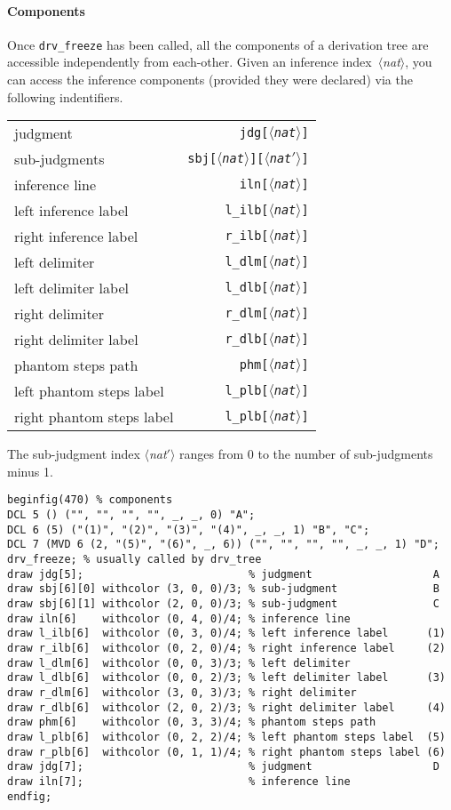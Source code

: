 \documentclass[twoside,11pt]{article}
\newcommand{\param}[1]{\textrm{\textit{$\langle$#1\/$\rangle$}}}
\begin{document}
\paragraph{Components}
%
%
Once \texttt{drv\_freeze} has been called, all the components of a derivation
tree are accessible independently from each-other. Given an inference
index~\param{nat}, you can access the inference components (provided they were
declared) via the following indentifiers.
\begin{center}
\begin{tabular}{lr}
judgment			&\texttt{jdg[\param{nat}]}\\
sub-judgments			&\texttt{sbj[\param{nat}][\param{nat$'$}]}\\
inference line			&\texttt{iln[\param{nat}]}\\
left inference label		&\texttt{l\_ilb[\param{nat}]}\\
right inference label		&\texttt{r\_ilb[\param{nat}]}\\
left delimiter			&\texttt{l\_dlm[\param{nat}]}\\
left delimiter label		&\texttt{l\_dlb[\param{nat}]}\\
right delimiter			&\texttt{r\_dlm[\param{nat}]}\\
right delimiter label		&\texttt{r\_dlb[\param{nat}]}\\
phantom steps path		&\texttt{phm[\param{nat}]}\\
left phantom steps label	&\texttt{l\_plb[\param{nat}]}\\
right phantom steps label	&\texttt{l\_plb[\param{nat}]}
\end{tabular}
\end{center}
The sub-judgment index \param{nat$'$} ranges from 0 to the number of sub-judgments minus 1.
%
%
\enlargethispage{\baselineskip}
\begin{Verbatim}
beginfig(470) % components
DCL 5 () ("", "", "", "", _, _, 0) "A";
DCL 6 (5) ("(1)", "(2)", "(3)", "(4)", _, _, 1) "B", "C";
DCL 7 (MVD 6 (2, "(5)", "(6)", _, 6)) ("", "", "", "", _, _, 1) "D";
drv_freeze; % usually called by drv_tree
draw jdg[5];                          % judgment                   A
draw sbj[6][0] withcolor (3, 0, 0)/3; % sub-judgment               B
draw sbj[6][1] withcolor (2, 0, 0)/3; % sub-judgment               C
draw iln[6]    withcolor (0, 4, 0)/4; % inference line
draw l_ilb[6]  withcolor (0, 3, 0)/4; % left inference label      (1)
draw r_ilb[6]  withcolor (0, 2, 0)/4; % right inference label     (2)
draw l_dlm[6]  withcolor (0, 0, 3)/3; % left delimiter
draw l_dlb[6]  withcolor (0, 0, 2)/3; % left delimiter label      (3)
draw r_dlm[6]  withcolor (3, 0, 3)/3; % right delimiter
draw r_dlb[6]  withcolor (2, 0, 2)/3; % right delimiter label     (4)
draw phm[6]    withcolor (0, 3, 3)/4; % phantom steps path
draw l_plb[6]  withcolor (0, 2, 2)/4; % left phantom steps label  (5)
draw r_plb[6]  withcolor (0, 1, 1)/4; % right phantom steps label (6)
draw jdg[7];                          % judgment                   D
draw iln[7];                          % inference line
endfig;
\end{Verbatim}
%
%
\end{document}
